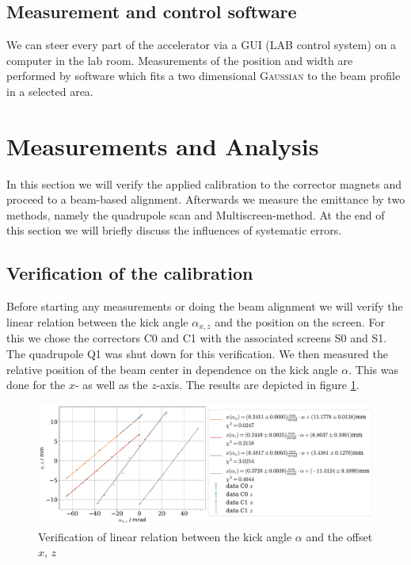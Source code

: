 \documentclass[11pt,a4paper,notitlepage]{scrartcl}
\begin{document}
\subsection{Measurement and control software}
We can steer every part of the accelerator via a GUI (LAB control system) on a computer in the lab room. Measurements of the position and width are performed by software which fits a two dimensional \textsc{Gaussian} to the beam profile in a selected area. 

\section{Measurements and Analysis}
In this section we will verify the applied calibration to the corrector magnets and proceed to a beam-based alignment. Afterwards we measure the emittance by two methods, namely the quadrupole scan and Multiscreen-method. At the end of this section we will briefly discuss the influences of systematic errors.
\label{sec:anal}
\subsection{Verification of the calibration}
Before starting any measurements or doing the beam alignment we will verify the linear relation between the kick angle $\alpha_{x,z}$ and the position on the screen. For this we chose the correctors C0 and C1 with the associated screens S0 and S1. The quadrupole Q1 was shut down for this verification. We then measured the relative position of the beam center in dependence on the kick angle $\alpha$. This was done for the $x$- as well as the $z$-axis. The results are depicted in figure \ref{fig:kick_verify}.
\begin{figure}[h]
	\centering
	\includegraphics[width=\linewidth]{figs/calibration/kick_verification.pdf}
	\caption{Verification of linear relation between the kick angle $\alpha$ and the offset $x$, $z$}\label{fig:kick_verify}
\end{figure}
\end{document}
